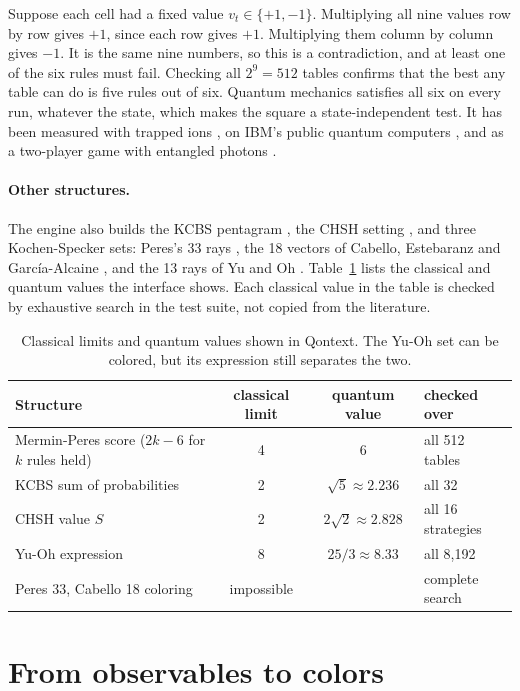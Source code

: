 \documentclass[11pt,a4paper]{article}
\theoremstyle{qresult}
\begin{document}
Suppose each cell had a fixed value $v_t \in \{+1,-1\}$. Multiplying all nine values row by row gives $+1$, since
each row gives $+1$. Multiplying them column by column gives $-1$. It is the same nine numbers, so this is a
contradiction, and at least one of the six rules must fail. Checking all $2^9 = 512$ tables confirms that the best
any table can do is five rules out of six. Quantum mechanics satisfies all six on every run, whatever the state, which
makes the square a state-independent test. It has been measured with trapped ions \citep{kirchmair2009}, on IBM's
public quantum computers \citep{dikme2020}, and as a two-player game with entangled photons \citep{xu2022}.

\paragraph{Other structures.} The engine also builds the KCBS pentagram \citep{kcbs2008}, the CHSH setting
\citep{chsh1969,tsirelson1980}, and three Kochen-Specker sets: Peres's 33 rays \citep{peres1991}, the 18 vectors of
Cabello, Estebaranz and Garc\'ia-Alcaine \citep{cabello1996}, and the 13 rays of Yu and Oh \citep{yuoh2012}.
Table~\ref{tab:limits} lists the classical and quantum values the interface shows. Each classical value in the table
is checked by exhaustive search in the test suite, not copied from the literature.

\begin{table}[tb]
\centering
\small
\begin{tabular}{@{}lccl@{}}
\toprule
Structure & classical limit & quantum value & checked over \\
\midrule
Mermin-Peres score ($2k-6$ for $k$ rules held) & 4 & 6 & all 512 tables \\
KCBS sum of probabilities & 2 & $\sqrt5 \approx 2.236$ & all 32 \\
CHSH value $S$ & 2 & $2\sqrt2 \approx 2.828$ & all 16 strategies \\
Yu-Oh expression & 8 & $25/3 \approx 8.33$ & all 8{,}192 \\
Peres 33, Cabello 18 coloring & impossible & & complete search \\
\bottomrule
\end{tabular}
\caption{Classical limits and quantum values shown in Qontext. The Yu-Oh set can be colored, but its expression still
separates the two.}
\label{tab:limits}
\end{table}

\section{From observables to colors}
\label{sec:method}
\end{document}
